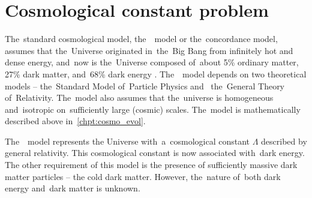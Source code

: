\section{Cosmological constant problem}
The~standard cosmological model, the~\LCDM\ model or the~concordance model, assumes that the~Universe originated in~the~Big Bang from infinitely hot and dense energy, and~now is the~Universe composed of~about 5\% ordinary matter, 27\% dark matter, and~68\% dark energy \parencite{redefineLCDM}. The~\LCDM\ model depends on two theoretical models -- the~Standard Model of~Particle Physics and~ the~General Theory of~Relativity. The~model also assumes that the~universe is homogeneous and~isotropic on~sufficiently large (cosmic) scales. The~model is mathematically described above in~\autoref{chpt:cosmo_evol}.

The~\LCDM\ model represents the Universe with~a~cosmological constant \(\Lambda\) described by general relativity. This cosmological constant is now associated with~dark energy. The other requirement of this model is the presence of sufficiently massive dark matter particles -- the cold dark matter. However, the~nature of~both dark energy and~dark matter is unknown.





